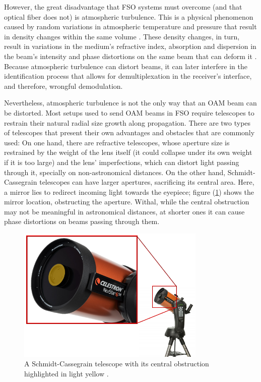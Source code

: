 However, the great disadvantage that FSO systems must overcome (and that optical fiber does not) is atmospheric turbulence. This is a physical phenomenon caused by random variations in atmospheric temperature and pressure that result in density changes within the same volume \cite{Field_Guide_to_Atmospheric_Optics}. These density changes, in turn, result in variations in the medium's refractive index, absorption and dispersion in the beam's intensity and phase distortions on the same beam that can deform it \cite{Rodenburg:12}. Because atmospheric turbulence can distort beams, it can later interfere in the identification process that allows for demultiplexation in the receiver's interface, and therefore, wrongful demodulation.

Nevertheless, atmospheric turbulence is not the only way that an OAM beam can be distorted. Most setups used to send OAM beams in FSO require telescopes to restrain their natural radial size growth along propagation. There are two types of telescopes that present their own advantages and obstacles that are commonly used: On one hand, there are refractive telescopes, whose aperture size is restrained by the weight of the lens itself (it could collapse under its own weight if it is too large) and the lens' imperfections, which can distort light passing through it, specially on non-astronomical distances. On the other hand, Schmidt-Cassegrain telescopes can have larger apertures, sacrificing its central area. Here, a mirror lies to redirect incoming light towards the eyepiece; figure (\ref{fig:intro-schmidt-cassegrain}) shows the mirror location, obstructing the aperture. Withal, while the central obstruction may not be meaningful in astronomical distances, at shorter ones it can cause phase distortions on beams passing through them.

\begin{figure}[htbp]
    \centering
    \includegraphics[width=9cm]{images/c03/Cassegrain-Obstruction.png}
    \caption{A Schmidt-Cassegrain telescope with its central obstruction highlighted in light yellow \protect\cite{Schmidt-Cassegrain_Pics}.}
    \label{fig:intro-schmidt-cassegrain}
\end{figure}

